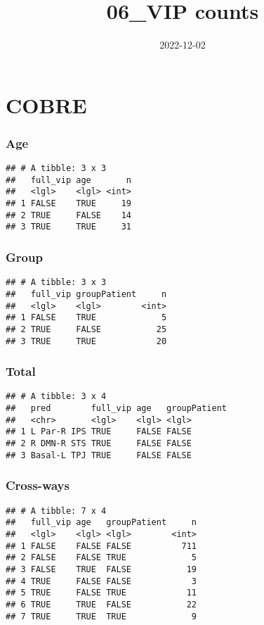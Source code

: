 \documentclass[
]{article}
\title{06\_VIP counts}
\author{}
\date{\vspace{-2.5em}2022-12-02}
\begin{document}
\maketitle

\hypertarget{cobre}{%
\section{COBRE}\label{cobre}}

\hypertarget{age}{%
\subsubsection{Age}\label{age}}

\begin{verbatim}
## # A tibble: 3 x 3
##   full_vip age       n
##   <lgl>    <lgl> <int>
## 1 FALSE    TRUE     19
## 2 TRUE     FALSE    14
## 3 TRUE     TRUE     31
\end{verbatim}

\hypertarget{group}{%
\subsubsection{Group}\label{group}}

\begin{verbatim}
## # A tibble: 3 x 3
##   full_vip groupPatient     n
##   <lgl>    <lgl>        <int>
## 1 FALSE    TRUE             5
## 2 TRUE     FALSE           25
## 3 TRUE     TRUE            20
\end{verbatim}

\hypertarget{total}{%
\subsubsection{Total}\label{total}}

\begin{verbatim}
## # A tibble: 3 x 4
##   pred        full_vip age   groupPatient
##   <chr>       <lgl>    <lgl> <lgl>       
## 1 L Par-R IPS TRUE     FALSE FALSE       
## 2 R DMN-R STS TRUE     FALSE FALSE       
## 3 Basal-L TPJ TRUE     FALSE FALSE
\end{verbatim}

\hypertarget{cross-ways}{%
\subsubsection{Cross-ways}\label{cross-ways}}

\begin{verbatim}
## # A tibble: 7 x 4
##   full_vip age   groupPatient     n
##   <lgl>    <lgl> <lgl>        <int>
## 1 FALSE    FALSE FALSE          711
## 2 FALSE    FALSE TRUE             5
## 3 FALSE    TRUE  FALSE           19
## 4 TRUE     FALSE FALSE            3
## 5 TRUE     FALSE TRUE            11
## 6 TRUE     TRUE  FALSE           22
## 7 TRUE     TRUE  TRUE             9
\end{verbatim}
\end{document}
